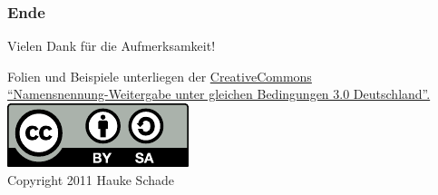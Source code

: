 
\begin{frame}
    \frametitle{Ende}

    \begin{center}
        Vielen Dank für die Aufmerksamkeit!
        
        \begin{scriptsize}
            Folien und Beispiele unterliegen der
            \href{http://creativecommons.org/licenses/by-sa/3.0/de/}{CreativeCommons \\
            "`Namensnennung-Weitergabe unter gleichen Bedingungen 3.0 Deutschland"'.\\[1em]
            \includegraphics[scale=0.5]{Bilder/cc-by-sa-gross.pdf}}\\[2em]
            
            Copyright 2011 Hauke Schade
        \end{scriptsize}
    \end{center}

\end{frame}    
